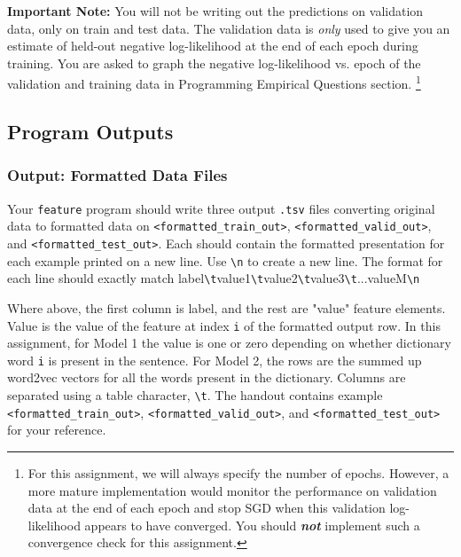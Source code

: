 \documentclass[11pt,addpoints,answers]{exam}
\begin{document}
\begin{notebox}
{\bf Important Note:} You will not be writing out the predictions on validation data, only on train and test data. The validation data is \emph{only} used to give you an estimate of held-out negative log-likelihood at the end of each epoch during training. You are asked to graph the negative log-likelihood vs. epoch of the validation and training data in Programming Empirical Questions section. \footnote{For this assignment, we will always specify the number of epochs. However, a more mature implementation would monitor the performance on validation data at the end of each epoch and stop SGD when this validation log-likelihood appears to have converged. You should \textbf{\emph{not}} implement such a convergence check for this assignment.} 
\end{notebox}

\subsection{Program Outputs}

\subsubsection{Output: Formatted Data Files} \label{format_output}
Your \lstinline{feature} program should write three output \texttt{.tsv} files converting original data to formatted data on \texttt{<formatted\_train\_out>}, \texttt{<formatted\_valid\_out>}, and \texttt{<formatted\_test\_out>}. Each should contain the formatted presentation for each example printed on a new line. Use \lstinline{\n} to create a new line. The format for each line should exactly match label\lstinline{\t}value1\lstinline{\t}value2\lstinline{\t}value3\lstinline{\t}...valueM\lstinline{\n}

Where above, the first column is label, and the rest are "value" feature elements. Value is the value of the feature at index \texttt{i} of the formatted output row. In this assignment, for Model 1 the value is one or zero depending on whether dictionary word \texttt{i} is present in the sentence. For Model 2, the rows are the summed up word2vec vectors for all the words present in the dictionary. Columns are separated using a table character, \lstinline{\t}. The handout contains example \texttt{<formatted\_train\_out>}, \newline \texttt{<formatted\_valid\_out>}, and \texttt{<formatted\_test\_out>} for your reference.
\end{document}
